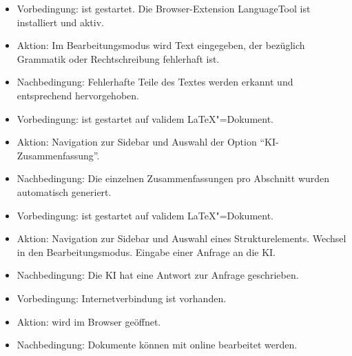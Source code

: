 \clearpage

\begin{itemize}
  \item Vorbedingung: \texla{} ist gestartet.
  Die Browser-Extension LanguageTool ist installiert und aktiv.
  \item Aktion: Im Bearbeitungsmodus wird Text eingegeben, der bezüglich Grammatik oder Rechtschreibung fehlerhaft
  ist.
  \item Nachbedingung: Fehlerhafte Teile des Textes werden erkannt und entsprechend hervorgehoben.
\end{itemize}

\begin{itemize}
  \item Vorbedingung: \texla{} ist gestartet auf validem \LaTeX"=Dokument.
  \item Aktion: Navigation zur Sidebar und Auswahl der Option \enquote{KI-Zusammenfassung}.
  \item Nachbedingung: Die einzelnen Zusammenfassungen pro Abschnitt wurden automatisch generiert.
\end{itemize}

\begin{itemize}
  \item Vorbedingung: \texla{} ist gestartet auf validem \LaTeX"=Dokument.
  \item Aktion: Navigation zur Sidebar und Auswahl eines Strukturelements.
  Wechsel in den Bearbeitungsmodus.
  Eingabe einer Anfrage an die KI.
  \item Nachbedingung: Die KI hat eine Antwort zur Anfrage geschrieben.
\end{itemize}

\begin{itemize}
  \item Vorbedingung: Internetverbindung ist vorhanden.
  \item Aktion: \texla{} wird im Browser geöffnet.
  \item Nachbedingung: Dokumente können mit \texla{} online bearbeitet werden.
\end{itemize}

\clearpage

